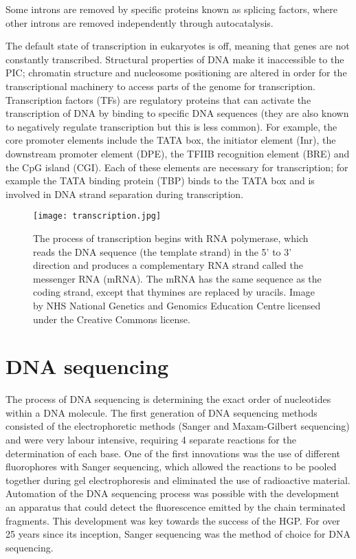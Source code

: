 Some introns are removed by specific proteins known as splicing factors, where other introns are removed independently through autocatalysis.

The default state of transcription in eukaryotes is off, meaning that genes are not constantly transcribed. Structural properties of DNA make it inaccessible to the PIC; chromatin structure and nucleosome positioning are altered in order for the transcriptional machinery to access parts of the genome for transcription. Transcription factors (TFs) are regulatory proteins that can activate the transcription of DNA by binding to specific DNA sequences (they are also known to negatively regulate transcription but this is less common). For example, the core promoter elements include the TATA box, the initiator element (Inr), the downstream promoter element (DPE), the TFIIB recognition element (BRE) and the CpG island (CGI). Each of these elements are necessary for transcription; for example the TATA binding protein (TBP) binds to the TATA box and is involved in DNA strand separation during transcription.

\begin{figure}[h]
   \centering
   \texttt{[image: transcription.jpg]}
   \caption[DNA transcription]{The process of transcription begins with RNA polymerase, which reads the DNA sequence (the template strand) in the 5' to 3' direction and produces a complementary RNA strand called the messenger RNA (mRNA). The mRNA has the same sequence as the coding strand, except that thymines are replaced by uracils. Image by NHS National Genetics and Genomics Education Centre licensed under the Creative Commons license.}
   \label{fig:transcription}
\end{figure}

\section{DNA sequencing}

The process of DNA sequencing is determining the exact order of nucleotides within a DNA molecule. The first generation of DNA sequencing methods consisted of the electrophoretic methods (Sanger and Maxam-Gilbert sequencing) and were very labour intensive, requiring 4 separate reactions for the determination of each base. One of the first innovations was the use of different fluorophores with Sanger sequencing, which allowed the reactions to be pooled together during gel electrophoresis and eliminated the use of radioactive material. Automation of the DNA sequencing process was possible with the development an apparatus that could detect the fluorescence emitted by the chain terminated fragments. This development was key towards the success of the HGP. For over 25 years since its inception, Sanger sequencing was the method of choice for DNA sequencing.

